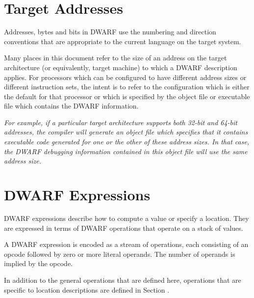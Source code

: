\section{Target Addresses}
\label{chap:targetaddressableunitsandaddresses}
\label{chap:targetaddresses}

Addresses, bytes and bits in DWARF use the numbering and direction
conventions that are appropriate to the current language on
the target system.

Many places in this document refer to the size of an address
on the target architecture (or equivalently, target machine)
to which a DWARF description applies. For processors which
can be configured to have different address sizes or different
instruction sets, the intent is to refer to the configuration
which is either the default for that processor or which is
specified by the object file or executable file which contains
the DWARF information.

\textit{%
For example, if a particular target architecture supports
both 32-bit and 64-bit addresses, the compiler will generate
an object file which specifies that it contains executable
code generated for one or the other of these 
address sizes. In
that case, the DWARF debugging information contained in this
object file will use the same address size.}

\section{DWARF Expressions}
\label{chap:dwarfexpressions}
DWARF expressions describe how to compute a value or 
specify a location. They are expressed in
terms of DWARF operations that operate on a stack of values.

A DWARF expression is encoded as a stream of operations, 
each consisting of an opcode followed by zero or more literal 
operands. The number of operands is implied by the opcode.  

In addition to the
general operations that are defined here, operations that are
specific to location descriptions are defined in 
Section .

